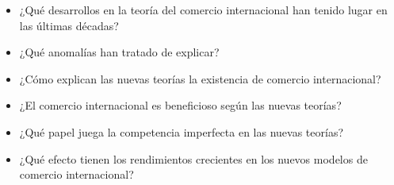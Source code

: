 \documentclass{nuevotema}
\begin{document}
\ideaclave

\begin{itemize}
	\item ¿Qué desarrollos en la teoría del comercio internacional han tenido lugar en las últimas décadas?
	\item ¿Qué anomalías han tratado de explicar?
	\item ¿Cómo explican las nuevas teorías la existencia de comercio internacional?
	\item ¿El comercio internacional es beneficioso según las nuevas teorías?
	\item ¿Qué papel juega la competencia imperfecta en las nuevas teorías?
	\item ¿Qué efecto tienen los rendimientos crecientes en los nuevos modelos de comercio internacional?
\end{itemize}

\esquemacorto
\end{document}
